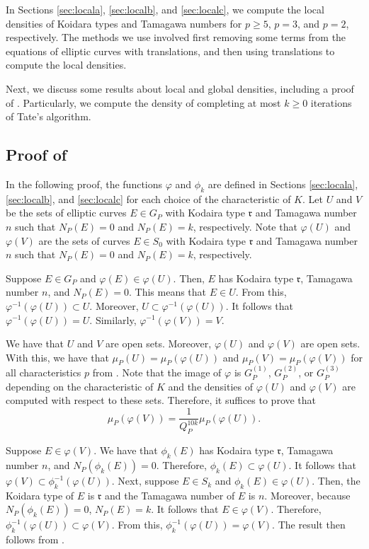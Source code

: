 \documentclass[12pt,letterpaper]{amsart}
\theoremstyle{definition}
\begin{document}
In Sections \ref{sec:locala}, \ref{sec:localb}, and \ref{sec:localc}, we compute the local densities of Koidara types and Tamagawa numbers for $p\geq 5$, $p=3$, and $p=2$, respectively. The methods we use involved first removing some terms from the equations of elliptic curves with translations, and then using translations to compute the local densities. 

Next, we discuss some results about local and global densities, including a proof of . Particularly, we compute the density of completing at most $k\geq 0$ iterations of Tate's algorithm. 

\subsection{Proof of \texorpdfstring{}{}}
\label{subsec:multiterproof}

In the following proof, the functions $\varphi$ and $\phi_k$ are defined in Sections \ref{sec:locala}, \ref{sec:localb}, and \ref{sec:localc} for each choice of the characteristic of $K$. Let $U$ and $V$ be the sets of elliptic curves $E\in G_P$ with Kodaira type $\mathfrak{r}$ and Tamagawa number $n$ such that $N_P(E)=0$ and $N_P(E)=k$, respectively. Note that $\varphi(U)$ and $\varphi(V)$ are the sets of curves $E\in S_0$ with Kodaira type $\mathfrak{r}$ and Tamagawa number $n$ such that $N_P(E)=0$ and $N_P(E)=k$, respectively.

Suppose $E\in G_P$ and $\varphi(E)\in \varphi(U)$. Then, $E$ has Kodaira type $\mathfrak{r}$, Tamagawa number $n$, and $N_P(E)=0$. This means that $E\in U$. From this, $\varphi^{-1}(\varphi(U))\subset U$. Moreover, $U\subset \varphi^{-1}(\varphi(U))$. It follows that $\varphi^{-1}(\varphi(U))=U$. Similarly, $\varphi^{-1}(\varphi(V))=V$.

We have that $U$ and $V$ are open sets. Moreover, $\varphi(U)$ and $\varphi(V)$ are open sets. With this, we have that $\mu_P(U)=\mu_P(\varphi(U))$ and $\mu_P(V)=\mu_P(\varphi(V))$ for all characteristics $p$ from . Note that the image of $\varphi$ is $G_P^{(1)}$, $G_P^{(2)}$, or $G_P^{(3)}$ depending on the characteristic of $K$ and the densities of $\varphi(U)$ and $\varphi(V)$ are computed with respect to these sets. Therefore, it suffices to prove that
\[
\mu_P(\varphi(V))=\frac{1}{Q_P^{10k}}\mu_P(\varphi(U)).
\]

Suppose $E\in\varphi(V)$. We have that $\phi_k(E)$ has Kodaira type $\mathfrak{r}$, Tamagawa number $n$, and $N_P(\phi_k(E))=0$. Therefore, $\phi_k(E)\subset\varphi(U)$. It follows that $\varphi(V)\subset \phi_k^{-1}(\varphi(U))$. Next, suppose $E\in S_k$ and $\phi_k(E)\in \varphi(U)$. Then, the Koidara type of $E$ is $\mathfrak{r}$ and the Tamagawa number of $E$ is $n$. Moreover, because $N_P(\phi_k(E))=0$, $N_P(E)=k$. It follows that $E\in \varphi(V)$. Therefore, $\phi_k^{-1}(\varphi(U))\subset \varphi(V)$. From this, $\phi_k^{-1}(\varphi(U))=\varphi(V)$. The result then follows from .
\end{document}
